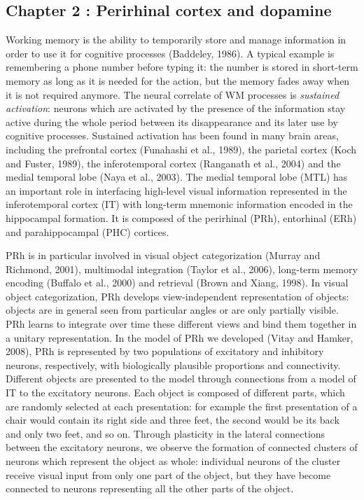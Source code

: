 \documentclass[
  11pt,
  a4paper,
]{scrbook}
\begin{document}
\subsection{Chapter 2 : Perirhinal cortex and
dopamine}\label{chapter-2-perirhinal-cortex-and-dopamine}

Working memory is the ability to temporarily store and manage
information in order to use it for cognitive processes (Baddeley, 1986).
A typical example is remembering a phone number before typing it: the
number is stored in short-term memory as long as it is needed for the
action, but the memory fades away when it is not required anymore. The
neural correlate of WM processes is \emph{sustained activation}: neurons
which are activated by the presence of the information stay active
during the whole period between its disappearance and its later use by
cognitive processes. Sustained activation has been found in many brain
areas, including the prefrontal cortex (Funahashi et al., 1989), the
parietal cortex (Koch and Fuster, 1989), the inferotemporal cortex
(Ranganath et al., 2004) and the medial temporal lobe (Naya et al.,
2003). The medial temporal lobe (MTL) has an important role in
interfacing high-level visual information represented in the
inferotemporal cortex (IT) with long-term mnemonic information encoded
in the hippocampal formation. It is composed of the perirhinal (PRh),
entorhinal (ERh) and parahippocampal (PHC) cortices.

PRh is in particular involved in visual object categorization (Murray
and Richmond, 2001), multimodal integration (Taylor et al., 2006),
long-term memory encoding (Buffalo et al., 2000) and retrieval (Brown
and Xiang, 1998). In visual object categorization, PRh develops
view-independent representation of objects: objects are in general seen
from particular angles or are only partially visible. PRh learns to
integrate over time these different views and bind them together in a
unitary representation. In the model of PRh we developed (Vitay and
Hamker, 2008), PRh is represented by two populations of excitatory and
inhibitory neurons, respectively, with biologically plausible
proportions and connectivity. Different objects are presented to the
model through connections from a model of IT to the excitatory neurons.
Each object is composed of different parts, which are randomly selected
at each presentation: for example the first presentation of a chair
would contain its right side and three feet, the second would be its
back and only two feet, and so on. Through plasticity in the lateral
connections between the excitatory neurons, we observe the formation of
connected clusters of neurons which represent the object as whole:
individual neurons of the cluster receive visual input from only one
part of the object, but they have become connected to neurons
representing all the other parts of the object.
\end{document}
